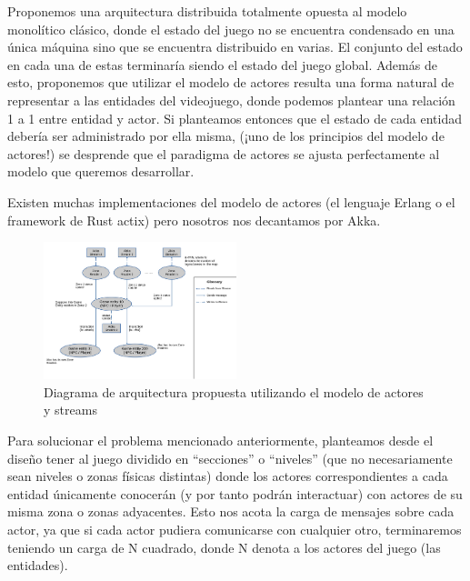 
Proponemos una arquitectura distribuida totalmente opuesta al modelo monolítico clásico, 
donde el estado del juego no se encuentra condensado en una única máquina sino que se encuentra 
distribuido en varias. El conjunto del estado en cada una de estas terminaría siendo el 
estado del juego global. Además de esto, proponemos que utilizar el modelo de actores resulta 
una forma natural de representar a las entidades del videojuego, donde podemos plantear una 
relación 1 a 1 entre entidad y actor. Si planteamos entonces que el estado de cada entidad 
debería ser administrado por ella misma, (¡uno de los principios del modelo de actores!) 
se desprende que el paradigma de actores se ajusta perfectamente al modelo que queremos desarrollar.

Existen muchas implementaciones del modelo de actores (el lenguaje Erlang o el framework de Rust actix) 
pero nosotros nos decantamos por Akka.


\begin{figure}[htbp]
    \centering
    \includegraphics[width=0.5\textwidth]{../assets/architecture.png}
    \caption{Diagrama de arquitectura propuesta utilizando el modelo de actores y streams}
\end{figure}

Para solucionar el problema mencionado anteriormente, planteamos desde el diseño tener al juego 
dividido en “secciones” o “niveles” (que no necesariamente sean niveles o zonas físicas distintas) 
donde los actores correspondientes a cada entidad únicamente conocerán (y por tanto podrán interactuar) 
con actores de su misma zona o zonas adyacentes. Esto nos acota la carga de mensajes sobre cada actor, 
ya que si cada actor pudiera comunicarse con cualquier otro, terminaremos teniendo un carga de 
N cuadrado, donde N denota a los actores del juego (las entidades).

